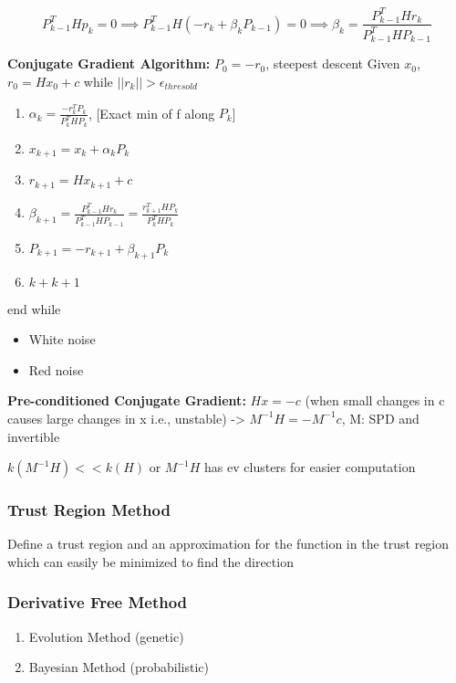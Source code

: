\documentclass[11pt]{article}
\begin{document}
\begin{enumerate}
\[ P_{k-1}^THp_k = 0 \implies P_{k-1}^TH(-r_k + \beta_kP_{k-1}) = 0 \implies \beta_k = \frac{P_{k-1}^THr_k}{P_{k-1}^THP_{k-1}} \]

\textbf{Conjugate Gradient Algorithm:}
\(P_0 = -r_0\), steepest descent
Given \(x_0\), \(r_0 = Hx_0 + c\)
while \(||r_k|| > \epsilon_{thresold}\)
\begin{enumerate}
\item \(\alpha_k = \frac{-r_k^TP_k}{P_k^THP_k}\), [Exact min of f along \(P_k\)]
\item \(x_{k+1} = x_k + \alpha_kP_k\)
\item \(r_{k+1} = Hx_{k+1} + c\)
\item \(\beta_{k+1} = \frac{P_{k-1}^THr_k}{P_{k-1}^THP_{k-1}} = \frac{r_{k+1}^THP_k}{P_k^THP_k}\)
\item \(P_{k+1} = -r_{k+1} + \beta_{k+1}P_k\)
\item \(k + k + 1\)
\end{enumerate}
end while

\begin{itemize}
\item White noise
\item Red noise
\end{itemize}

\textbf{Pre-conditioned Conjugate Gradient:}
\(Hx = -c\) (when small changes in c causes large changes in x i.e., unstable)
-> \(M^{-1}H = -M^{-1}c\), M: SPD and invertible

\(k(M^{-1}H) << k(H)\) or \(M^{-1}H\) has ev clusters for easier computation
\end{enumerate}

\subsubsection{Trust Region Method}
\label{sec:orgb776142}
Define a trust region and an approximation for the function in the trust region which can easily be minimized to find the direction
\subsubsection{Derivative Free Method}
\label{sec:orge77d565}
\begin{enumerate}
\item Evolution Method (genetic)
\label{sec:orga03fcf9}
\item Bayesian Method (probabilistic)
\label{sec:org7b763af}
\end{enumerate}
\end{document}

